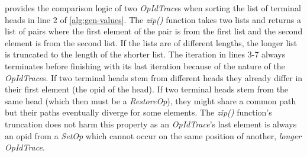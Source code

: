\documentclass[sigplan,natbib=false,review]{acmart}
\newcommand{\setopkind}{\textit{SetOp}}
\newcommand{\restopkind}{\textit{RestoreOp}}
\newcommand{\opidtrace}{\textit{OpIdTrace}}
\begin{document}
 provides the comparison logic of two \opidtrace{}s
when sorting the list of terminal heads in line 2 of \cref{alg:gen-values}.
The \textit{zip()} function takes two lists and returns a list of pairs
where the first element of the pair is from the first list and the second
element is from the second list.
If the lists are of different lengths, the longer list is truncated to the
length of the shorter list.
The iteration in lines 3-7 always terminates before finishing with
its last iteration because of the nature of the \opidtrace{}s.
If two terminal heads stem from different heads they already differ in their
first element (the \gls*{opid} of the head).
If two terminal heads stem from the same head (which then must be a \restopkind{}),
they might share a common path but their paths eventually diverge for some elements.
The \textit{zip()} function's truncation does not harm this property
as an \opidtrace{}'s last element is always an \gls*{opid} from a \setopkind{}
which cannot occur on the same position of another, \emph{longer} \opidtrace{}.
\end{document}
